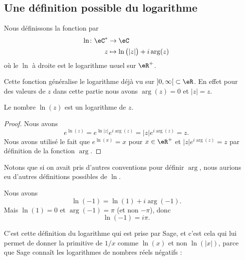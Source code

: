 \subsection{Une définition possible du logarithme}


\begin{definition}      \label{DEFooWDYNooYIXVMC}
	Nous définissons la fonction  par
	\begin{equation}
		\begin{aligned}
			\ln\colon \eC^* & \to \eC                               \\
			z               & \mapsto \ln\big( | z | \big)+i\arg(z)
		\end{aligned}
	\end{equation}
	où le \( \ln\) à droite est le logarithme usuel sur \( \eR^+\).
\end{definition}

\begin{remark}
	Cette fonction généralise le logarithme déjà vu sur \( \mathopen] 0 , \infty \mathclose[\subset \eR\). En effet pour des valeurs de \( z\) dans cette partie nous avons \( \arg(z)=0\) et \( | z |=z\).
\end{remark}

\begin{lemma}
	Le nombre \( \ln(z)\) est un logarithme de \( z\).
\end{lemma}

\begin{proof}
	Nous avons
	\begin{equation}
		e^{\ln(z)}= e^{\ln| z |} e^{i\arg(z)}=| z | e^{i\arg(z)}=z.
	\end{equation}
	Nous avons utilisé le fait que \(  e^{\ln(x)}=x\) pour \( x\in\eR^+\) et \( | z | e^{i\arg(z)}=z\) par définition de la fonction \( \arg\).
\end{proof}

Notons que si on avait pris d'autres conventions pour définir \( \arg\), nous aurions eu d'autres définitions possibles de \( \ln\).

\begin{example}
	Nous avons
	\begin{equation}
		\ln(-1)=\ln(1)+i\arg(-1).
	\end{equation}
	Mais \( \ln(1)=0\) et \( \arg(-1)=\pi\) (et non \( -\pi\)), donc
	\begin{equation}
		\ln(-1)=i\pi.
	\end{equation}

	C'est cette définition du logarithme qui est prise par Sage, et c'est cela qui lui permet de donner la primitive de \( 1/x\) comme \( \ln(x)\) et non \( \ln(| x |)\), parce que Sage connaît les logarithmes de nombres réels négatifs :
	
\end{example}

